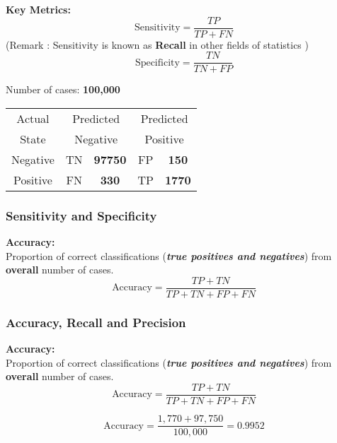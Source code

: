 \documentclass{beamer}
\begin{document}
\begin{frame}

{\LARGE
\textbf{Key Metrics:} 
\[ \mbox{Sensitivity}= \frac{TP}{TP+FN}  \]
}
{
\large
(Remark : Sensitivity is known as \textbf{Recall} in other fields of statistics )
}
{\LARGE
\[ \mbox{Specificity}=\frac{TN}{TN+FP}  \]
}


\end{frame}

\begin{frame}
\Large
Number of cases: \textbf{100,000}\\ 
\begin{center}

\begin{table}[!htbp]
\begin{tabular}{c *4c}
\toprule
Actual &  \multicolumn{2}{c}{Predicted} & \multicolumn{2}{c}{Predicted}\\
State &  \multicolumn{2}{c}{Negative} & \multicolumn{2}{c}{Positive}\\
\midrule
Negative   & \phantom{spa} TN & \textbf{97750}\phantom{spa}   & FP  & \textbf{150}\\
Positive   & \phantom{spa} FN & \textbf{330} \phantom{spa}   & TP  & \textbf{1770}\\

\bottomrule
\end{tabular}
\end{table}
\end{center}
\end{frame}
\begin{frame}
\frametitle{Sensitivity and Specificity}
\Large
\textbf{Accuracy:} \\Proportion of correct classifications (\textit{\textbf{true positives and negatives}}) from \textbf{overall} number of cases.
\[ \mbox{Accuracy}=\frac{TP+TN}{TP+TN+FP+FN}  \]

\phantom{Line1}
\phantom{Line1}

\end{frame}
\begin{frame}
\frametitle{Accuracy, Recall and Precision}
\Large
\textbf{Accuracy:} \\Proportion of correct  classifications (\textit{\textbf{true positives and negatives}}) from \textbf{overall} number of cases.
\[ \mbox{Accuracy}=\frac{TP+TN}{TP+TN+FP+FN}  \]


\[ \mbox{Accuracy}=\frac{1,770 + 97,750}{100,000} =0.9952 \]

\end{frame}
\end{document}
